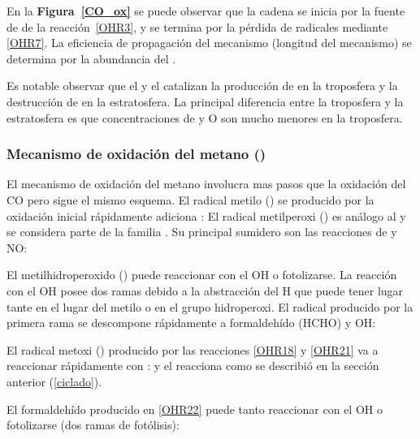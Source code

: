 En la \textbf{Figura~\ref{CO_ox}} se puede observar que la cadena se inicia por la fuente de  de la reacción~\ref{OHR3}, y se termina por la pérdida de radicales  mediante \ref{OHR7}. La eficiencia de propagación del mecanismo (longitud del mecanismo) se determina por la abundancia del .

Es notable observar que el  y el  catalizan la producción de  en la troposfera y la destrucción de  en la estratosfera. La principal diferencia entre la troposfera y la estratosfera es que concentraciones de  y O son mucho menores en la troposfera.

\subsubsection{Mecanismo de oxidaci\'on del metano ()}

El mecanismo de oxidación del metano involucra mas pasos que la oxidación del CO pero sigue el mismo esquema. El radical metilo () se producido por la oxidación inicial rápidamente adiciona :
El radical metilperoxi () es análogo al  y se considera parte de la familia . Su principal sumidero son las reacciones de    y NO:

El metilhidroperoxido () puede reaccionar con el OH o fotolizarse. La reacción con el OH posee dos ramas debido a la abstracción del H que puede tener lugar tante en el lugar del metilo o en el grupo hidroperoxi. El radical   producido por la primera rama se descompone rápidamente a formaldehído (HCHO) y OH:


El radical metoxi () producido por las reacciones \ref{OHR18} y \ref{OHR21} va a reaccionar rápidamente con :
y el  reacciona  como se describió en la sección anterior (\ref{ciclado}).

El formaldehído producido en \ref{OHR22} puede tanto reaccionar con el OH o fotolizarse (dos ramas de fotólisis):


